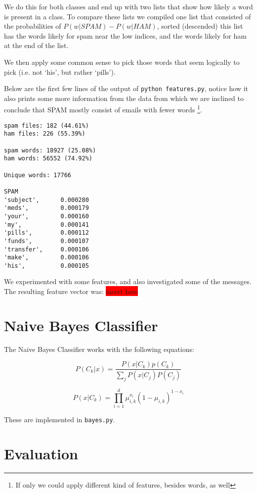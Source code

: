 \documentclass[a4paper,11pt]{article}
\newcommand{\todo}[1]{\colorbox{red}{\color{white}#1}}
\begin{document}
We do this for both classes and end up with two lists that show how likely 
a word is present in a class. To compare these lists we compiled one list
that consisted of the probabilities of $P(w|SPAM) - P(w|HAM)$, sorted 
(descended) this 
list has the words likely for spam near the low indices, and the words likely
for ham at the end of the list. 

We then apply some common sense to pick those words that seem logically to 
pick (i.e. not `his', but rather `pills').  

Below are the first few lines of the output of \texttt{python features.py}, 
notice how it also prints some more information from the data from which we 
are inclined to conclude that SPAM mostly consist of emails with fewer words \footnote{If only we could apply different kind of features, besides words, as well}. 
\begin{center}
\begin{verbatim}
spam files: 182 (44.61%)
ham files: 226 (55.39%)

spam words: 18927 (25.08%)
ham words: 56552 (74.92%)

Unique words: 17766

SPAM
'subject',      0.000280
'meds',         0.000179
'your',         0.000160
'my',           0.000141
'pills',        0.000112
'funds',        0.000107
'transfer',     0.000106
'make',         0.000106
'his',          0.000105
\end{verbatim}
\end{center}

We experimented with some features, and also investigated some of the 
messages. The resulting feature vector was: \todo{insert here}

\section{Naive Bayes Classifier}
The Naive Bayes Classifier works with the following equations: 

\begin{equation}
P(C_k|x) = \frac{P(x|C_k)p(C_k)}{\sum_j P(x|C_j)P(C_j)}
\label{eq:1}
\end{equation}

\begin{equation}
P(x|C_k)= \prod_{i=1}^d \mu^{x_i}_{i, k}(1 - \mu_{i,k})^{1-x_i}
\label{eq:2}
\end{equation}

These are implemented in \texttt{bayes.py}. 


\section{Evaluation}
\end{document}
